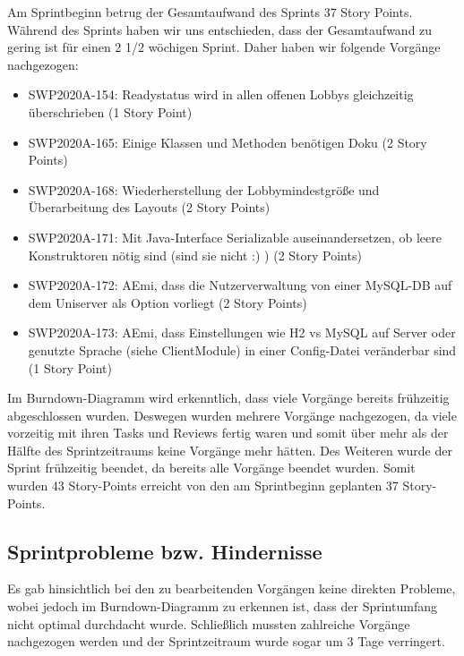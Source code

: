 \documentclass[12pt,a4paper, oneside]{article}
\begin{document}
    \noindent
    Am Sprintbeginn betrug der Gesamtaufwand des Sprints 37 Story Points. Während des Sprints haben wir uns entschieden, dass der Gesamtaufwand zu gering ist für einen 2 1/2 wöchigen Sprint. Daher haben wir folgende Vorgänge nachgezogen:

    \begin{itemize}
        \item SWP2020A-154: Readystatus wird in allen offenen Lobbys gleichzeitig überschrieben    (1 Story Point)

        \item SWP2020A-165: Einige Klassen und Methoden benötigen Doku (2 Story Points)

        \item SWP2020A-168: Wiederherstellung der Lobbymindestgröße und Überarbeitung des Layouts (2 Story Points)

        \item SWP2020A-171: Mit Java-Interface Serializable auseinandersetzen, ob leere Konstruktoren nötig sind (sind sie nicht :) )    (2 Story Points)

        \item SWP2020A-172: AEmi, dass die Nutzerverwaltung von einer MySQL-DB auf dem Uniserver als Option vorliegt (2 Story Points)


        \item SWP2020A-173: AEmi, dass Einstellungen wie H2 vs MySQL auf Server oder genutzte Sprache (siehe ClientModule) in einer Config-Datei veränderbar sind (1 Story Point)

    \end{itemize}

    \noindent
    Im Burndown-Diagramm wird erkenntlich, dass viele Vorgänge bereits frühzeitig abgeschlossen wurden. Deswegen wurden mehrere Vorgänge nachgezogen, da viele vorzeitig mit ihren Tasks und Reviews fertig waren und somit über mehr als der Hälfte des Sprintzeitraums keine Vorgänge mehr hätten. Des Weiteren wurde der Sprint frühzeitig beendet, da bereits alle Vorgänge beendet wurden. Somit wurden 43 Story-Points erreicht von den am Sprintbeginn geplanten 37 Story-Points.

    \subsection{Sprintprobleme bzw. Hindernisse}
    Es gab hinsichtlich bei den zu bearbeitenden Vorgängen keine direkten Probleme, wobei jedoch im Burndown-Diagramm zu erkennen ist, dass der Sprintumfang nicht optimal durchdacht wurde.
    \noindent
    Schließlich mussten zahlreiche Vorgänge nachgezogen werden und der Sprintzeitraum wurde sogar um 3 Tage verringert.
\end{document}
